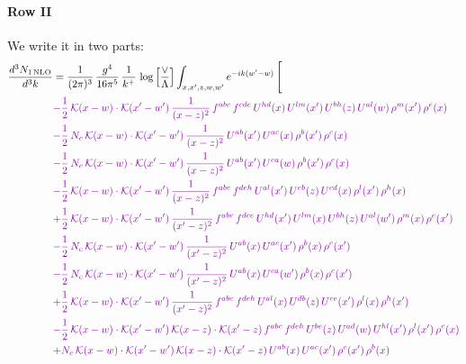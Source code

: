 \documentclass[10pt]{article}
\numberwithin{equation}{section}
\begin{document}
\paragraph{Row II}
We write it in two parts:
\begin{align}
\frac{d^{3}N_{1\,\mathrm{NLO}}}{d^{3}k} & = \frac{1}{(2\pi)^{3}}\,\frac{g^{4}}{16\pi^{5}}\,\frac{1}{k^{+}}\,\log\Big[\frac{\vee}{\Lambda}\Big]\int_{x,x',z,w,w'}e^{-ik(w'-w)}\,\Bigg[\notag\\ &{\color{CC} -\frac{1}{2}\,\mathcal{K}(x-w)\cdot\mathcal{K}(x'-w')\,\frac{1}{(x-z)^{2}}\,f^{abc}\,f^{cde}\,U^{hd}(x)\,U^{lm}(x')\,U^{bh}(z)\,U^{al}(w)\,\rho^{m}(x')\,\rho^{e}(x)} \notag\\
&{\color{CC} -\frac{1}{2}\,N_{c}\,\mathcal{K}(x-w)\cdot\mathcal{K}(x'-w')\,\frac{1}{(x-z)^{2}}\,U^{ab}(x')\,U^{ac}(x)\,\rho^{b}(x')\,\rho^{c}(x)} \notag\\
&{\color{CC} -\frac{1}{2}\,N_{c}\,\mathcal{K}(x-w)\cdot\mathcal{K}(x'-w')\,\frac{1}{(x-z)^{2}}\,U^{ab}(x')\,U^{ca}(w)\,\rho^{b}(x')\,\rho^{c}(x)} \notag\\
&{\color{CC} -\frac{1}{2}\,\mathcal{K}(x-w)\cdot\mathcal{K}(x'-w')\,\frac{1}{(x-z)^{2}}\,f^{abc}\,f^{deh}\,U^{al}(x')\,U^{eb}(z)\,U^{cd}(x)\,\rho^{l}(x')\,\rho^{h}(x)} \notag\\
&{\color{CC} +\frac{1}{2}\,\mathcal{K}(x-w)\cdot\mathcal{K}(x'-w')\,\frac{1}{(x'-z)^{2}}\,f^{abc}\,f^{dce}\,U^{hd}(x')\,U^{lm}(x)\,U^{bh}(z)\,U^{al}(w')\,\rho^{m}(x)\,\rho^{e}(x')} \notag\\
&{\color{CC} -\frac{1}{2}\,N_{c}\,\mathcal{K}(x-w)\cdot\mathcal{K}(x'-w')\,\frac{1}{(x'-z)^{2}}\,U^{ab}(x)\,U^{ac}(x')\,\rho^{b}(x)\,\rho^{c}(x')} \notag\\
&{\color{CC} -\frac{1}{2}\,N_{c}\,\mathcal{K}(x-w)\cdot\mathcal{K}(x'-w')\,\frac{1}{(x'-z)^{2}}\,U^{ab}(x)\,U^{ca}(w')\,\rho^{b}(x)\,\rho^{c}(x')} \notag\\
&{\color{CC} +\frac{1}{2}\,\mathcal{K}(x-w)\cdot\mathcal{K}(x'-w')\,\frac{1}{(x'-z)^{2}}\,f^{abc}\,f^{deh}\,U^{al}(x)\,U^{db}(z)\,U^{ce}(x')\,\rho^{l}(x)\,\rho^{h}(x')} \notag\\
&{\color{CC} -\frac{1}{2}\,\mathcal{K}(x-w)\cdot\mathcal{K}(x'-w')\,\mathcal{K}(x-z)\cdot\mathcal{K}(x'-z)\,f^{abc}\,f^{deh}\,U^{be}(z)\,U^{ad}(w)\,U^{hl}(x')\,\rho^{l}(x')\,\rho^{c}(x)} \notag\\
&{\color{CC} +N_{c}\,\mathcal{K}(x-w)\cdot\mathcal{K}(x'-w')\,\mathcal{K}(x-z)\cdot\mathcal{K}(x'-z)\,U^{ab}(x)\,U^{ac}(x')\,\rho^{c}(x')\,\rho^{b}(x)} \notag\\

\end{align}
\end{document}
